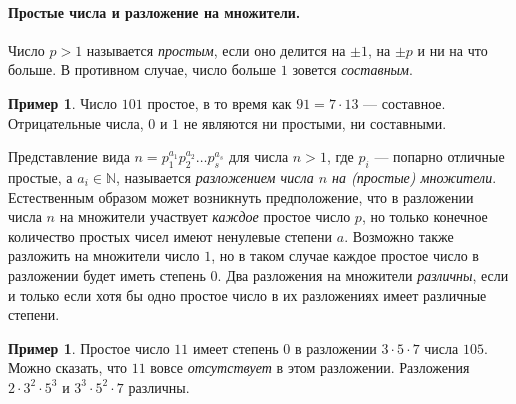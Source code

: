 \documentclass[12pt,notitlepage]{article}
\theoremstyle{plain}
\newtheorem{lemma}[thm]{Лемма}
\theoremstyle{definition}
\newtheorem{exm}[thm]{Пример}
\theoremstyle{plain}
\newcommand{\N}{\mathbb{N}}
\newcommand{\1}{\mathbf{1}}
\newcommand{\0}{\mathbf{0}}
\newcommand{\dvd}{\mathop{\mid}}
\newcommand{\mcomm}[1]{}
\begin{document}
\paragraph{Простые числа и разложение на множители.} Число $p > 1$ называется \emph{простым}, если оно делится на $\pm 1$, на $\pm p$ и ни на что больше. В противном случае, число больше $1$ зовется \emph{составным}.

\begin{exm}
	Число $101$ простое, в то время как $91 = 7 \cdot 13$ --- составное. Отрицательные числа, $0$ и $1$ не являются ни простыми, ни составными.
\end{exm}


Представление вида $n = p_1^{a_1} p_2^{a_2} \ldots p_s^{a_s}$ для числа $n > 1$, где $p_i$ --- попарно отличные простые, а $a_i \in \N$, называется \emph{разложением числа $n$ на (простые) множители}. Естественным образом может возникнуть предположение, что в разложении числа $n$ на множители участвует \emph{каждое} простое число $p$, но только конечное количество простых чисел имеют ненулевые степени $a$. Возможно также разложить на множители число $1$, но в таком случае каждое простое число в разложении будет иметь степень $0$. Два разложения на множители \emph{различны}, если и только если хотя бы одно простое число в их разложениях имеет различные степени.

\mcomm{It would be very natural to define a factorization as a function from primes to naturals with a finite support. Unfortunately, we have not enough set theory up to this point to do so. However, the students are usually happy with these ugly notions of `distinct' factorizations etc. for those are intuitive enough.}

\begin{exm}
	Простое число $11$ имеет степень $0$ в разложении $3 \cdot 5 \cdot 7$ числа $105$. Можно сказать, что $11$ вовсе \emph{отсутствует} в этом разложении. Разложения $2 \cdot 3^2 \cdot 5^3$ и $3^3 \cdot 5^2 \cdot 7$ различны.
\end{exm}
\end{document}
